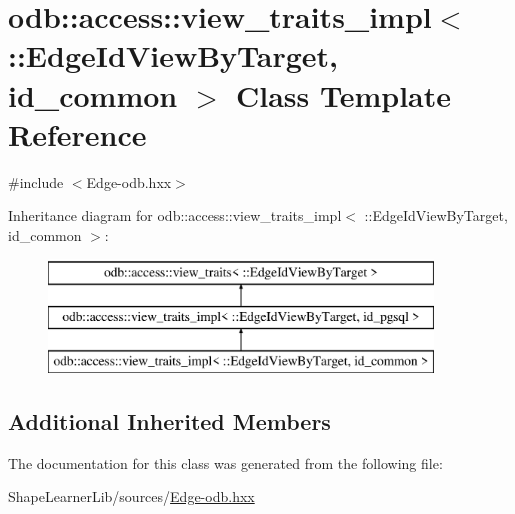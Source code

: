 \hypertarget{classodb_1_1access_1_1view__traits__impl_3_01_1_1_edge_id_view_by_target_00_01id__common_01_4}{}\section{odb\+:\+:access\+:\+:view\+\_\+traits\+\_\+impl$<$ \+:\+:Edge\+Id\+View\+By\+Target, id\+\_\+common $>$ Class Template Reference}
\label{classodb_1_1access_1_1view__traits__impl_3_01_1_1_edge_id_view_by_target_00_01id__common_01_4}


{\ttfamily \#include $<$Edge-\/odb.\+hxx$>$}

Inheritance diagram for odb\+:\+:access\+:\+:view\+\_\+traits\+\_\+impl$<$ \+:\+:Edge\+Id\+View\+By\+Target, id\+\_\+common $>$\+:\begin{figure}[H]
\begin{center}
\leavevmode
\includegraphics[height=3.000000cm]{d2/dd6/classodb_1_1access_1_1view__traits__impl_3_01_1_1_edge_id_view_by_target_00_01id__common_01_4}
\end{center}
\end{figure}
\subsection*{Additional Inherited Members}


The documentation for this class was generated from the following file\+:\begin{DoxyCompactItemize}
\item 
Shape\+Learner\+Lib/sources/\hyperlink{_edge-odb_8hxx}{Edge-\/odb.\+hxx}\end{DoxyCompactItemize}
